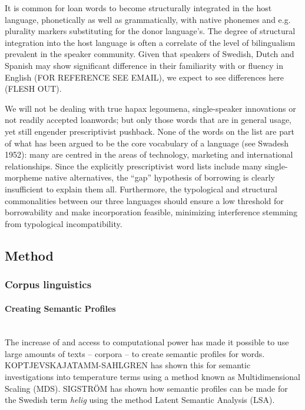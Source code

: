 \documentclass[a4paper]{article}
\begin{document}
It is common for loan words to become structurally integrated in the host language, phonetically as well as grammatically, with native phonemes and e.g. plurality markers substituting for the donor language's. The degree of structural integration into the host language is often a correlate of the level of bilingualism prevalent in the speaker community. Given that speakers of Swedish, Dutch and Spanish may show significant difference in their familiarity with or fluency in English (FOR REFERENCE SEE EMAIL), we expect to see differences here (FLESH OUT). 

We will not be dealing with true hapax legoumena, single-speaker innovations or not readily accepted loanwords; but only those words that are in general usage, yet still engender prescriptivist pushback. None of the words on the list are part of what has been argued to be the core vocabulary of a language (see Swadesh 1952): many are centred in the areas of technology, marketing and international relationships. Since the explicitly prescriptivist word lists include many single-morpheme native alternatives, the ``gap'' hypothesis of borrowing is clearly insufficient to explain them all. Furthermore, the typological and structural commonalities between our three languages should ensure a low threshold for borrowability and make incorporation feasible, minimizing interference stemming from typological incompatibility.


\subsection{Method}


\subsubsection{Corpus linguistics}

\paragraph{Creating Semantic Profiles} \hspace{0pt} \\
The increase of and access to computational power has made it possible to use large amounts of texts -- corpora -- to create semantic profiles for words. KOPTJEVSKAJATAMM-SAHLGREN has shown this for semantic investigations into temperature terms using a method known as Multidimensional Scaling (MDS). SIGSTR\"OM has shown how semantic profiles can be made for the Swedish term \textit{helig} using the method Latent Semantic Analysis (LSA). 
\end{document}
